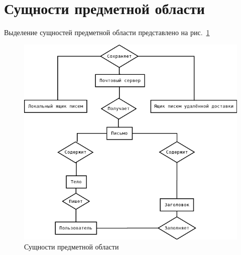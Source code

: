 \section{Сущности предметной области}
Выделение сущностей предметной области представлено на рис.~\ref{fig:er} 


\begin{figure}[ht]
\centering
\includegraphics[width=\textwidth]{dia/er.png}
\caption{Сущности предметной области}
\label{fig:er}
\end{figure}





